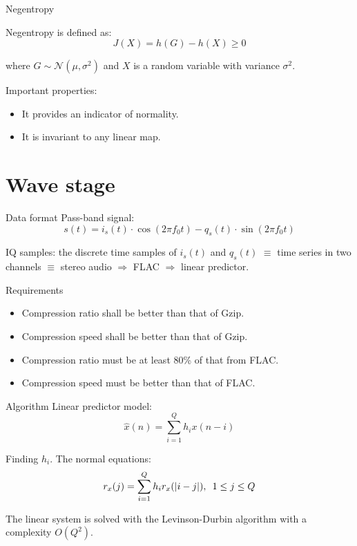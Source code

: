 \documentclass[usenames,dvipsnames]{beamer}
\begin{document}
\begin{frame}{Negentropy}
	
Negentropy is defined as:
\[
J(X) = h(G) - h(X) \geq 0
\]

where $G \sim \mathscr{N}(\mu, \sigma^2)$ and $X$ is a random variable with variance $\sigma^2$.
\vspace{1em}

Important properties:
\begin{itemize}
	\item It provides an indicator of normality.
	\item It is invariant to any linear map.
\end{itemize}
\end{frame}

\section{Wave stage}
\begin{frame}{Data format}
Pass-band signal:
\[
s(t) = i_s(t) \cdot \cos(2\pi f_0 t) - q_s(t) \cdot \sin(2\pi f_0 t)
\]

IQ samples: the discrete time samples of $i_s(t)$ and $q_s(t)$ $\equiv$ time series in two channels $\equiv$ stereo audio $\Rightarrow$ FLAC $\Rightarrow$ linear predictor.
\end{frame}

\begin{frame}{Requirements}
\begin{itemize}
	\item<1-> Compression ratio shall be better than that of Gzip.
	\item<1-> Compression speed shall be better than that of Gzip.
	\item<2-> Compression ratio must be at least 80\% of that from FLAC.
	\item<2-> Compression speed must be better than that of FLAC.
\end{itemize}
\end{frame}

\begin{frame}{Algorithm}
Linear predictor model:
\[
\hat{x}(n) = \sum_{i=1}^{Q} h_i x(n-i)
\]

Finding $h_i$. The normal equations:
\[
r_x(j) = \sum_{i=1}^{Q} h_i r_x(|i-j|) ,\hspace{0.5em} 1 \leq j \leq Q
\]

The linear system is solved with the Levinson-Durbin algorithm with a complexity $O(Q^2)$.

\end{frame}
\end{document}
